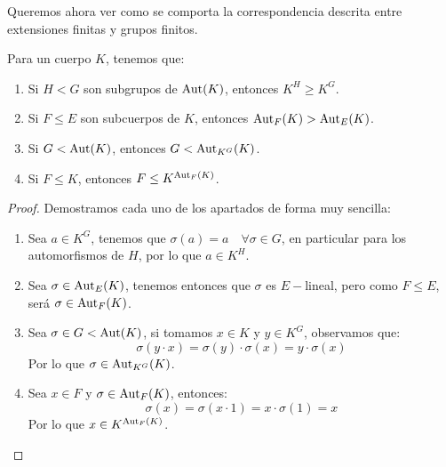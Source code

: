 Queremos ahora ver como se comporta la correspondencia descrita entre extensiones finitas y grupos finitos.
\begin{lema}\label{lema:inclusiones}
    Para un cuerpo $K$, tenemos que:
    \begin{enumerate}
        \item Si $H< G$ son subgrupos de $\operatorname{Aut}(K)$, entonces $K^H \geq K^G$. %
        \item Si $F\leq E$ son subcuerpos de $K$, entonces $\operatorname{Aut}_F(K)> \operatorname{Aut}_E(K)$.
        \item Si $G< \operatorname{Aut}(K)$, entonces $G< \operatorname{Aut}_{K^G}(K)$.
        \item Si $F\leq K$, entonces $F\leq K^{\operatorname{Aut}_F(K)}$.
    \end{enumerate}
    \begin{proof}
        Demostramos cada uno de los apartados de forma muy sencilla:
        \begin{enumerate}
            \item Sea $a\in K^G$, tenemos que $\sigma(a) = a\quad \forall \sigma\in G$, en particular para los automorfismos de $H$, por lo que $a\in K^H$.
            \item Sea $\sigma \in \operatorname{Aut}_E(K)$, tenemos entonces que $\sigma$ es $E-$lineal, pero como $F\leq E$, será $\sigma\in \operatorname{Aut}_F(K)$.
            \item Sea $\sigma\in G< \operatorname{Aut}(K)$, si tomamos $x\in K$ y $y\in K^G$, observamos que:
                \begin{equation*}
                    \sigma(y\cdot x) = \sigma(y)\cdot \sigma(x) = y\cdot \sigma(x)
                \end{equation*}
                Por lo que $\sigma\in \operatorname{Aut}_{K^G}(K)$.
            \item Sea $x\in F$ y $\sigma \in \operatorname{Aut}_F(K)$, entonces:
                \begin{equation*}
                    \sigma(x) = \sigma(x\cdot 1) = x\cdot \sigma(1) = x
                \end{equation*}
                Por lo que $x\in K^{\operatorname{Aut}_F(K)}$.
        \end{enumerate}
    \end{proof}
\end{lema}


